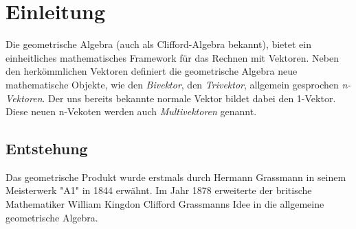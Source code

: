 %
%
%
%
\section{Einleitung\label{geoalgebra:section:teil0}}
Die geometrische Algebra (auch als Clifford-Algebra bekannt), bietet ein einheitliches mathematisches
Framework für das Rechnen mit Vektoren.
Neben den herkömmlichen Vektoren definiert die geometrische
Algebra neue mathematische Objekte, wie den \emph{Bivektor}, den \emph{Trivektor}, allgemein gesprochen
\emph{n-Vektoren}.
Der uns bereits bekannte normale Vektor bildet dabei den 1-Vektor. Diese neuen n-Vekoten werden auch
\emph{Multivektoren} genannt.

\subsection{Entstehung}
Das geometrische Produkt wurde erstmals durch Hermann Grassmann in seinem Meisterwerk "A1" in 1844
erwähnt. Im Jahr 1878 erweiterte der britische Mathematiker William Kingdon Clifford Grassmanns Idee
in die allgemeine geometrische Algebra. 

